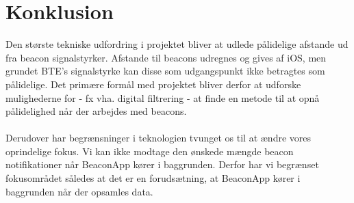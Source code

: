 \chapter{Konklusion}

Den største tekniske udfordring i projektet bliver at udlede pålidelige afstande ud fra beacon signalstyrker. Afstande til beacons udregnes og gives af iOS, men grundet BTE's signalstyrke kan disse som udgangspunkt ikke betragtes som pålidelige. Det primære formål med projektet bliver derfor at udforske mulighederne for - fx vha. digital filtrering - at finde en metode til at opnå pålidelighed når der arbejdes med beacons. 
\\ \\
Derudover har begrænsninger i teknologien tvunget os til at ændre vores oprindelige fokus. Vi kan ikke modtage den ønskede mængde beacon notifikationer når BeaconApp kører i baggrunden. Derfor har vi begrænset fokusområdet således at det er en forudsætning, at BeaconApp kører i baggrunden når der opsamles data.

